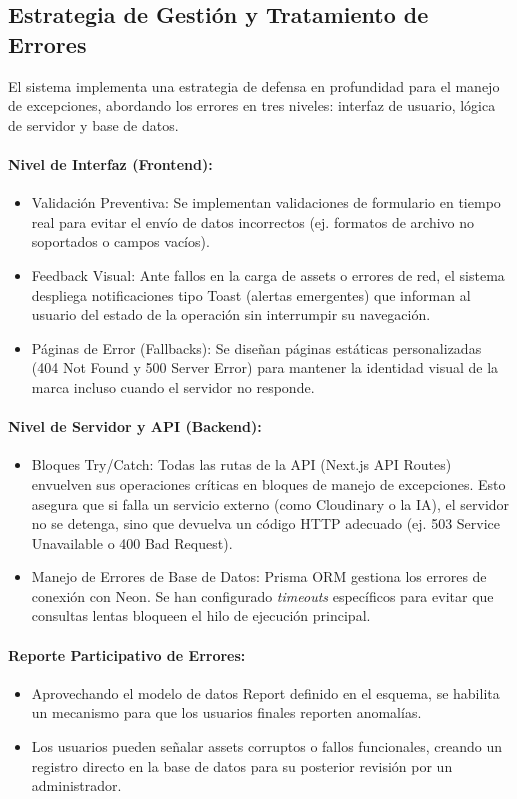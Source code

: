 \subsection{Estrategia de Gestión y Tratamiento de Errores}

El sistema implementa una estrategia de defensa en profundidad para el manejo de excepciones, abordando los errores en tres niveles: interfaz de usuario, lógica de servidor y base de datos.

\paragraph{Nivel de Interfaz (Frontend):}
\begin{itemize}
    \item Validación Preventiva: Se implementan validaciones de formulario en tiempo real para evitar el envío de datos incorrectos (ej. formatos de archivo no soportados o campos vacíos).
    \item Feedback Visual: Ante fallos en la carga de assets o errores de red, el sistema despliega notificaciones tipo Toast (alertas emergentes) que informan al usuario del estado de la operación sin interrumpir su navegación.
    \item Páginas de Error (Fallbacks): Se diseñan páginas estáticas personalizadas (404 Not Found y 500 Server Error) para mantener la identidad visual de la marca incluso cuando el servidor no responde.
\end{itemize}

\paragraph{Nivel de Servidor y API (Backend):}
\begin{itemize}
    \item Bloques Try/Catch: Todas las rutas de la API (Next.js API Routes) envuelven sus operaciones críticas en bloques de manejo de excepciones. Esto asegura que si falla un servicio externo (como Cloudinary o la IA), el servidor no se detenga, sino que devuelva un código HTTP adecuado (ej. 503 Service Unavailable o 400 Bad Request).
    \item Manejo de Errores de Base de Datos: Prisma ORM gestiona los errores de conexión con Neon. Se han configurado \textit{timeouts} específicos para evitar que consultas lentas bloqueen el hilo de ejecución principal.
\end{itemize}

\paragraph{Reporte Participativo de Errores:}
\begin{itemize}
    \item Aprovechando el modelo de datos Report definido en el esquema, se habilita un mecanismo para que los usuarios finales reporten anomalías.
    \item Los usuarios pueden señalar assets corruptos o fallos funcionales, creando un registro directo en la base de datos para su posterior revisión por un administrador.
\end{itemize}

